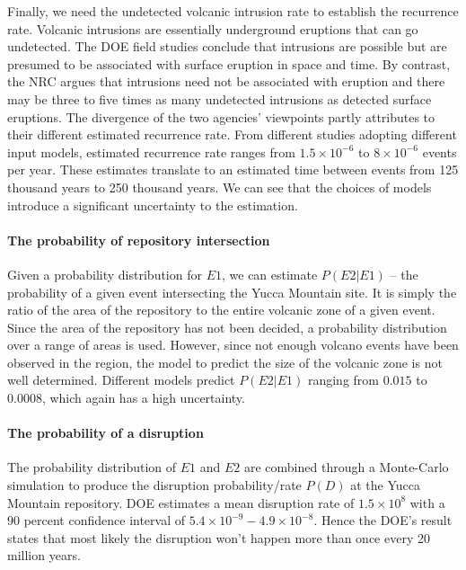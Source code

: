 \documentclass[nofootinbib,preprint,aip,pra]{revtex4-1}
\begin{document}
        Finally, we need the undetected volcanic intrusion rate to establish the recurrence rate. Volcanic
        intrusions are essentially underground eruptions that can go undetected. The DOE field studies conclude
        that intrusions are possible but are presumed to be associated with surface eruption in space and time. 
        By contrast, the NRC argues that intrusions need not be associated with eruption and there
        may be three to five times as many undetected intrusions as detected surface eruptions. The divergence
        of the two agencies' viewpoints partly attributes to their different estimated recurrence rate.
        From different studies adopting different input models, estimated recurrence rate ranges from
        $1.5\times 10^{-6}$ to $8\times 10^{-6}$ events per year. These estimates translate to an estimated
        time between events from 125 thousand years to 250 thousand years. We can see that the choices of
        models introduce a significant uncertainty to the estimation.\cite{me06}

        \paragraph{The probability of repository intersection}
        Given a probability distribution for $E1$, we can estimate $P(E2|E1)$ -- the probability of
        a given event intersecting the Yucca Mountain site. It is simply the ratio of the area of
        the repository to the entire volcanic zone of a given event. Since the area of the repository
        has not been decided, a probability distribution over a range of areas is used.
        However, since not enough volcano events have been observed in the region, the model
        to predict the size of the volcanic zone is not well determined.
        Different models predict $P(E2|E1)$ ranging from $0.015$ to $0.0008$, which again has a high
        uncertainty.

        \paragraph{The probability of a disruption} The probability distribution of $E1$ and $E2$
        are combined through a Monte-Carlo simulation to produce the disruption probability/rate $P(D)$
        at the Yucca Mountain repository. DOE estimates a mean disruption rate of $1.5\times 10^8$ with
        a 90 percent confidence interval of $5.4\times 10^{-9}-4.9\times 10^{-8}$. Hence the DOE's result
        states that most likely the disruption won't happen more than once every 20 million years.
\end{document}
